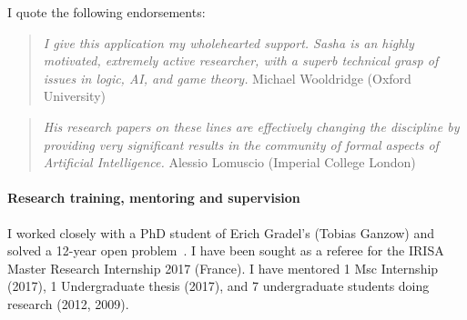 \documentclass[a4paper,12pt]{scrartcl}
\renewcommand{\todo}[1]{}
\begin{document}
I quote the following endorsements:
\begin{quotation}
\emph{I give this application my wholehearted support. Sasha is an highly motivated, extremely active researcher, with a superb technical grasp of issues in logic, AI, and game theory.} \hfill Michael Wooldridge (Oxford University)
\end{quotation}
\begin{quotation}
\emph{His research papers on
these lines are effectively changing the discipline by providing very significant results in the
community of formal aspects of Artificial Intelligence. } \hfill Alessio Lomuscio (Imperial College London)
\end{quotation}



% 


\paragraph{Research training, mentoring and supervision}


I worked closely with a PhD student of Erich Gradel's (Tobias Ganzow) and solved a 12-year open problem~\cite{DBLP:conf/stacs/GanzowR08}.
I have been sought as a referee for the IRISA Master Research Internship 2017 (France).
I have mentored 1 Msc Internship (2017), 1 Undergraduate thesis (2017), and 7 undergraduate 
students doing research (2012, 2009).
\end{document}
